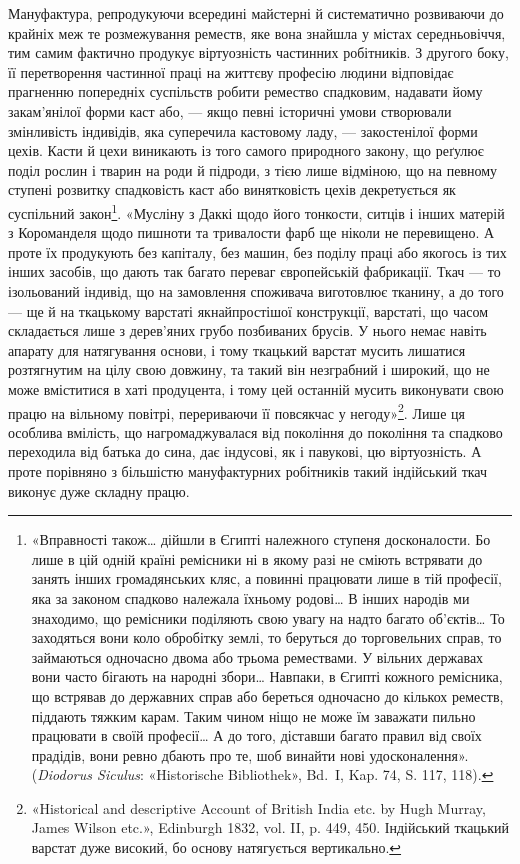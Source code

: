 Мануфактура, репродукуючи всередині майстерні й систематично
розвиваючи до крайніх меж те розмежування реместв,
яке вона знайшла у містах середньовіччя, тим самим фактично
продукує віртуозність частинних робітників. З другого боку, її
перетворення частинної праці на життєву професію людини
відповідає прагненню попередніх суспільств робити ремество спадковим,
надавати йому закам’янілої форми каст або, — якщо
певні історичні умови створювали змінливість індивідів, яка
суперечила кастовому ладу, — закостенілої форми цехів. Касти
й цехи виникають із того самого природного закону, що реґулює
поділ рослин і тварин на роди й підроди, з тією лише відміною,
що на певному ступені розвитку спадковість каст або винятковість
цехів декретується як суспільний закон\footnote{
«Вправності також\dots{} дійшли в Єгипті належного ступеня досконалости.
Бо лише в цій одній країні ремісники ні в якому разі не сміють
встрявати до занять інших громадянських кляс, а повинні працювати
лише в тій професії, яка за законом спадково належала їхньому родові\dots{}
В інших народів ми знаходимо, що ремісники поділяють свою увагу на
надто багато об'єктів\dots{} То заходяться вони коло обробітку землі, то беруться
до торговельних справ, то займаються одночасно двома або трьома
ремествами. У вільних державах вони часто бігають на народні збори\dots{}
Навпаки, в Єгипті кожного ремісника, що встрявав до державних справ
або береться одночасно до кількох реместв, піддають тяжким карам.
Таким чином ніщо не може їм заважати пильно працювати в своїй професії\dots{}
А до того, діставши багато правил від своїх прадідів, вони ревно
дбають про те, шоб винайти нові удосконалення». (\emph{Diodorus Siculus}:
«Historische Bibliothek», Bd.~I, Kap. 74, S. 117, 118).
}. «Мусліну з Даккі
щодо його тонкости, ситців і інших матерій з Короманделя щодо
пишноти та тривалости фарб ще ніколи не перевищено. А проте
їх продукують без капіталу, без машин, без поділу праці або
якогось із тих інших засобів, що дають так багато переваг європейській
фабрикації. Ткач — то ізольований індивід, що на замовлення споживача виготовлює
тканину, а до того — ще й на ткацькому
варстаті якнайпростішої конструкції, варстаті, що
часом складається лише з дерев’яних грубо позбиваних брусів.
У нього немає навіть апарату для натягування основи, і тому
ткацький варстат мусить лишатися розтягнутим на цілу свою
довжину, та такий він незграбний і широкий, що не може вміститися в хаті
продуцента, і тому цей останній мусить виконувати свою працю на вільному
повітрі, перериваючи її повсякчас у негоду»\footnote{
«Historical and descriptive Account of British India etc. by
Hugh Murray, James Wilson etc.», Edinburgh 1832, vol. II, p. 449, 450.
Індійський ткацький варстат дуже високий, бо основу натягується вертикально.
}.
Лише ця особлива вмілість, що нагромаджувалася
від покоління до покоління та спадково переходила від батька
до сина, дає індусові, як і павукові, цю віртуозність. А проте
порівняно з більшістю мануфактурних робітників такий індійський ткач виконує
дуже складну працю.

